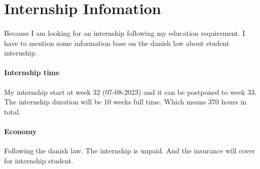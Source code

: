 \section{Internship Infomation}
\paragraph{}
Because I am looking for an internship following my education requirement.
I have to mention some information base on the danish law about student internship.

\paragraph{Internship time}
My internship start at week 32 (07-08-2023) and it can be postponed to week 33.\\
The internship duration will be 10 weeks full time.
Which means 370 hours in total.

\paragraph{Economy}
Following the danish law.
The internship is unpaid.
And the insurance will cover for internship student.